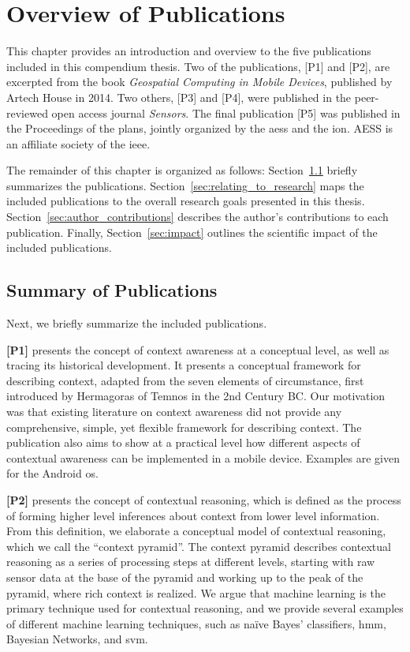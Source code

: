 \chapter{Overview of Publications}
\label{ch:overview_of_publications}

This chapter provides an introduction and overview to the five publications included in this compendium thesis. Two of the publications, [P1] and [P2], are excerpted from the book \emph{Geospatial Computing in Mobile Devices}, published by Artech House in 2014. Two others, [P3] and [P4], were published in the peer-reviewed open access journal \emph{Sensors}. The final publication [P5] was published in the Proceedings of the \gls{plans}, jointly organized by the \gls{aess} and the \gls{ion}. AESS is an affiliate society of the \gls{ieee}.

The remainder of this chapter is organized as follows: Section~\ref{sec:summary} briefly summarizes the publications. Section~\ref{sec:relating_to_research} maps the included publications to the overall research goals presented in this thesis. Section~\ref{sec:author_contributions} describes the author's contributions to each publication. Finally, Section~\ref{sec:impact} outlines the scientific impact of the included publications.

\section{Summary of Publications}
\label{sec:summary}

Next, we briefly summarize the included publications.

\textbf{[P1]} presents the concept of context awareness at a conceptual level, as well as tracing its historical development. It presents a conceptual framework for describing context, adapted from the seven elements of circumstance, first introduced by Hermagoras of Temnos in the 2nd Century BC. Our motivation was that existing literature on context awareness did not provide any comprehensive, simple, yet flexible framework for describing context. The publication also aims to show at a practical level how different aspects of contextual awareness can be implemented in a mobile device. Examples are given for the Android \gls{os}.

\textbf{[P2]} presents the concept of contextual reasoning, which is defined as the process of forming higher level inferences about context from lower level information. From this definition, we elaborate a conceptual model of contextual reasoning, which we call the ``context pyramid''. The context pyramid describes contextual reasoning as a series of processing steps at different levels, starting with raw sensor data at the base of the pyramid and working up to the peak of the pyramid, where rich context is realized. We argue that machine learning is the primary technique used for contextual reasoning, and we provide several examples of different machine learning techniques, such as  na\"{i}ve Bayes’ classifiers, \gls{hmm}, Bayesian Networks, and \gls{svm}.

